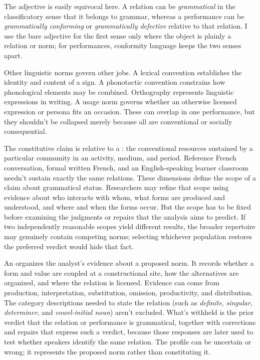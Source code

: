 \documentclass[12pt,letterpaper]{article}
\begin{document}
The adjective  is easily equivocal here. A relation can be
\emph{grammatical} in the classificatory sense that it belongs to grammar, whereas
a performance can be \emph{grammatically conforming} or \emph{grammatically
defective} relative to that relation. I use the bare adjective for the first sense
only where the object is plainly a relation or norm; for performances, conformity
language keeps the two senses apart.

Other linguistic norms govern other jobs. A lexical convention establishes the
identity and content of a sign. A phonotactic convention constrains how
phonological elements may be combined. Orthography represents linguistic
expressions in writing. A usage norm
governs whether an otherwise licensed expression or persona fits an occasion.
These can overlap in one performance, but they shouldn't be collapsed
merely because all are conventional or socially consequential.

The constitutive claim is relative to a : the conventional resources sustained
by a particular community in an activity, medium, and period. Reference French
conversation, formal written French, and an English-speaking learner classroom
needn't sustain exactly the same relations. These dimensions define the scope of a
claim about grammatical status. Researchers may refine that scope using evidence
about who interacts with whom, what forms are produced and understood,
and where and when the forms occur. But the scope has to be fixed before examining
the judgments or repairs that the analysis aims to predict. If two independently
reasonable scopes yield different results, the broader repertoire may genuinely
contain competing norms; selecting whichever population restores the preferred
verdict would hide that fact.

An  organizes the analyst's evidence about a proposed
norm. It records whether a form and value are coupled at a constructional site,
how the alternatives are organized, and where the relation is licensed. Evidence
can come from production, interpretation, substitution, omission, productivity,
and distribution. The category descriptions needed to state the relation (such
as \emph{definite}, \emph{singular}, \emph{determiner}, and \emph{vowel-initial
noun}) aren't excluded. What's withheld is the prior verdict that the relation or
performance is grammatical, together with corrections and repairs that express
such a verdict, because those responses are later used to test whether speakers
identify the same relation. The profile can be uncertain or wrong; it represents
the proposed norm rather than constituting it.
\end{document}
